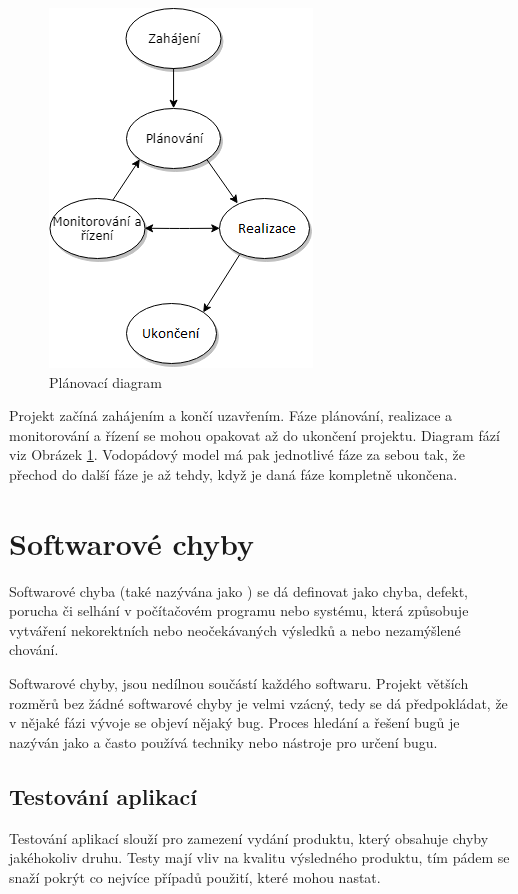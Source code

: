 \documentclass[czech,DP]{thesiskiv}
\begin{document}

\begin{figure}[!ht]
\begin{center}
	\includegraphics[scale=1.25]{Pic/planingDiagram.png}
\end{center}
\label{pic:planingDiagram}
\caption{Plánovací diagram}
\end{figure}


Projekt začíná zahájením a končí uzavřením. Fáze plánování, realizace a monitorování a řízení se mohou opakovat až do ukončení projektu. Diagram fází viz Obrázek \ref{pic:planingDiagram}. Vodopádový model má pak jednotlivé fáze za sebou tak, že přechod do další fáze je až tehdy, když je daná fáze kompletně ukončena.

\section{Softwarové chyby}
Softwarové chyba (také nazývána jako ) se dá definovat jako chyba, defekt, porucha či selhání v počítačovém programu nebo systému, která způsobuje vytváření nekorektních nebo neočekávaných výsledků a nebo nezamýšlené chování. 

Softwarové chyby, jsou nedílnou součástí každého softwaru. Projekt větších rozměrů bez žádné softwarové chyby je velmi vzácný, tedy se dá předpokládat, že v nějaké fázi vývoje se objeví nějaký bug. Proces hledání a řešení bugů je nazýván jako  a často používá techniky nebo nástroje pro určení bugu. 

\subsection{Testování aplikací}
Testování aplikací slouží pro zamezení vydání produktu, který obsahuje chyby jakéhokoliv druhu. Testy mají vliv na kvalitu výsledného produktu, tím pádem se snaží pokrýt co nejvíce případů použití, které mohou nastat.
\end{document}

